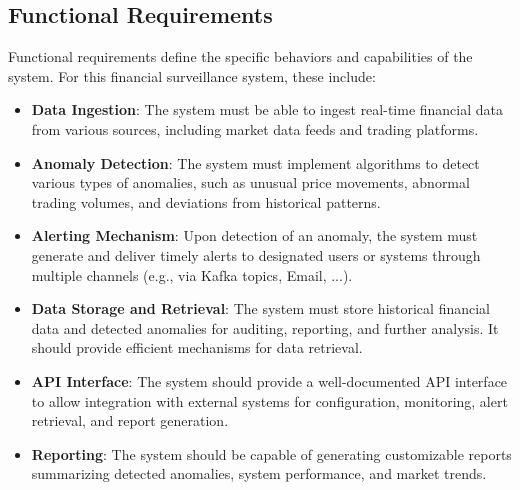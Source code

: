 \subsection{Functional Requirements}
Functional requirements define the specific behaviors and capabilities of the system. For this financial surveillance system, these include:
\begin{itemize}
    \item \textbf{Data Ingestion}: The system must be able to ingest real-time financial data from various sources, including market data feeds and trading platforms.
    \item \textbf{Anomaly Detection}: The system must implement algorithms to detect various types of anomalies, such as unusual price movements, abnormal trading volumes, and deviations from historical patterns.
    \item \textbf{Alerting Mechanism}: Upon detection of an anomaly, the system must generate and deliver timely alerts to designated users or systems through multiple channels (e.g., via Kafka topics, Email, ...).
    \item \textbf{Data Storage and Retrieval}: The system must store historical financial data and detected anomalies for auditing, reporting, and further analysis. It should provide efficient mechanisms for data retrieval.
    \item \textbf{API Interface}: The system should provide a well-documented API interface to allow integration with external systems for configuration, monitoring, alert retrieval, and report generation.
    \item \textbf{Reporting}: The system should be capable of generating customizable reports summarizing detected anomalies, system performance, and market trends.
\end{itemize}

